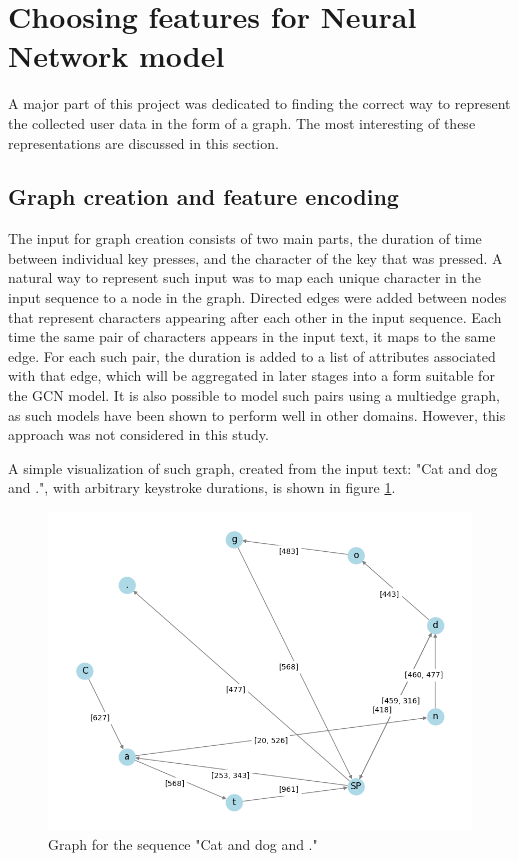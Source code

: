 
\section{Choosing features for Neural Network model}
A major part of this project was dedicated to finding the correct way to represent the collected user data in the form of a graph. The most interesting of these representations are discussed in this section.


\subsection{Graph creation and feature encoding}
The input for graph creation consists of two main parts, the duration of time between individual key presses, and the character of the key that was pressed.
A natural way to represent such input was to map each unique character in the input sequence to a node in the graph. 
Directed edges were added between nodes that represent characters appearing after each other in the input sequence. Each time the same pair of characters appears in the input text, it maps to the same edge. For each such pair, the duration is added to a list of attributes associated with that edge, which will be aggregated in later stages into a form suitable for the GCN model. It is also possible to model such pairs using a multiedge graph, as such models have been shown to perform well in other domains. However, this approach was not considered in this study. 

A simple visualization of such graph, created from the input text: "Cat and dog and .", with arbitrary keystroke durations, is shown in figure \ref{fig:example_graph}.

\begin{figure}[H]
	\centering
	\includegraphics[width=.65\textwidth]{images/graph_with_edge.png} 	
	\caption{Graph for the sequence "Cat and dog and ."}
	\label{fig:example_graph}
\end{figure}


